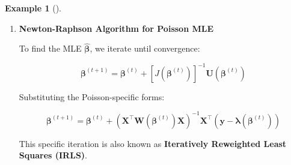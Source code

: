 \documentclass[
  letterpaper,
  DIV=11,
  numbers=noendperiod]{scrreprt}
\renewcommand{\[}{\begin{equation}}
\renewcommand{\]}{\end{equation}}
\theoremstyle{definition}
\theoremstyle{plain}
\theoremstyle{plain}
\theoremstyle{plain}
\theoremstyle{definition}
\newtheorem{example}{Example}[chapter]
\theoremstyle{plain}
\theoremstyle{remark}
\begin{document}
\begin{example}[]
\begin{enumerate}
  \begin{itemize}
  \item
    \textbf{Score Vector (\(\mathbf{U}\)):} \[
      \mathbf{U}(\boldsymbol{\beta}) = \mathbf{T}(\mathbf{y}) - \nabla A(\boldsymbol{\beta}) = \mathbf{X}^\top \mathbf{y} - \mathbf{X}^\top \boldsymbol{\lambda}(\boldsymbol{\beta}) = \mathbf{X}^\top (\mathbf{y} - \boldsymbol{\lambda}(\boldsymbol{\beta}))
      \] where
    \(\boldsymbol{\lambda}(\boldsymbol{\beta}) = (\lambda_1(\boldsymbol{\beta}), \dots, \lambda_n(\boldsymbol{\beta}))^\top\).
  \item
    \textbf{Fisher Information (\(J\)):} The information is the Hessian
    of the log-partition function: \[
      J(\boldsymbol{\beta}) = \nabla^2 A(\boldsymbol{\beta}) = \mathbf{X}^\top \mathbf{W}(\boldsymbol{\beta}) \mathbf{X}
      \] where
    \(\mathbf{W}(\boldsymbol{\beta}) = \text{diag}(\lambda_1(\boldsymbol{\beta}), \dots, \lambda_n(\boldsymbol{\beta}))\).
  \end{itemize}

  The details of procedure for deriving the above formula for score and
  fisher information matrix using scalar derivative is given
  \textbf{?@exm-poisson-score-fisher}.
\item
  \textbf{Newton-Raphson Algorithm for Poisson MLE}

  To find the MLE \(\hat{\boldsymbol{\beta}}\), we iterate until
  convergence:

  \[
   \boldsymbol{\beta}^{(t+1)} = \boldsymbol{\beta}^{(t)} + [J(\boldsymbol{\beta}^{(t)})]^{-1} \mathbf{U}(\boldsymbol{\beta}^{(t)})
   \]

  Substituting the Poisson-specific forms:

  \[
   \boldsymbol{\beta}^{(t+1)} = \boldsymbol{\beta}^{(t)} + (\mathbf{X}^\top \mathbf{W}(\boldsymbol{\beta}^{(t)}) \mathbf{X})^{-1} \mathbf{X}^\top (\mathbf{y} - \boldsymbol{\lambda}(\boldsymbol{\beta}^{(t)}))
   \]

  This specific iteration is also known as \textbf{Iteratively
  Reweighted Least Squares (IRLS)}.
\end{enumerate}

\end{example}
\end{document}

